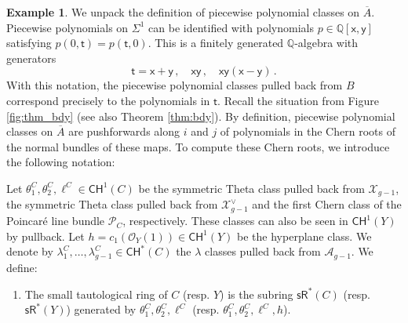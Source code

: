 \documentclass[11pt]{article}
\def\CH{\mathsf{CH}}
\def\sR{\mathsf{sR}}
\newcommand{\barA}{\overline{A}}
\theoremstyle{definition}
\newtheorem{example}[definition]{Example}
\begin{document}
\begin{example}\label{expl:pp_s_1}
    We unpack the definition of piecewise polynomial classes on $\barA$. Piecewise polynomials on $\Sigma^{1}$ can be identified with polynomials
    $p \in \mathbb{Q}[\mathsf{x},\mathsf{y}]$ satisfying $p(0,\mathsf{t})=p(\mathsf{t},0)$. This is a finitely generated $\mathbb{Q}$-algebra with generators
    \[
        \mathsf{t} = \mathsf{x} + \mathsf{y}\, ,\quad
        \mathsf{x} \mathsf{y}\, ,\quad
        \mathsf{x}\mathsf{y}(\mathsf{x} - \mathsf{y})\,.
    \]
    With this notation, the piecewise polynomial classes pulled back from $B$ correspond precisely to the polynomials in $\mathsf{t}$.
	Recall the situation from Figure \ref{fig:thm_bdy} (see also Theorem \ref{thm:bdy}). By definition, piecewise polynomial classes on
	$\barA$ are pushforwards along $i$ and $j$ of polynomials in the Chern roots of the normal bundles of these maps. To compute these
	Chern roots, we introduce the following notation:

	Let $\theta^C_1, \theta^C_2, \ell^C \in \CH^1(C)$ be the symmetric Theta class
	pulled back from $\mathcal X_{g-1}$, the symmetric Theta class pulled back from $\mathcal X_{g-1}^{\vee}$
	and the first Chern class of the Poincar\'e line bundle $\mathcal P_C$, respectively. These
	classes can also be seen in $\CH^1(Y)$ by pullback. Let $h = c_1(\mathcal O_Y(1)) \in \CH^1(Y)$
	be the hyperplane class. We denote by $\lambda_1^C, \ldots, \lambda_{g-1}^C\in \CH^{\ast}(C)$ the $\lambda$ classes pulled back
	from $\mathcal A_{g-1}$. We define:
	\begin{enumerate}[label = (\alph*)]
		\item The small tautological ring of $C$ (resp. $Y$) is the subring $\sR^*(C)$ (resp. $\sR^*(Y)$) generated by $\theta_1^C, \theta_2^C, \ell^C$ (resp. $\theta_1^C, \theta_2^C, \ell^C, h$).


\end{enumerate}
\end{example}
\end{document}
